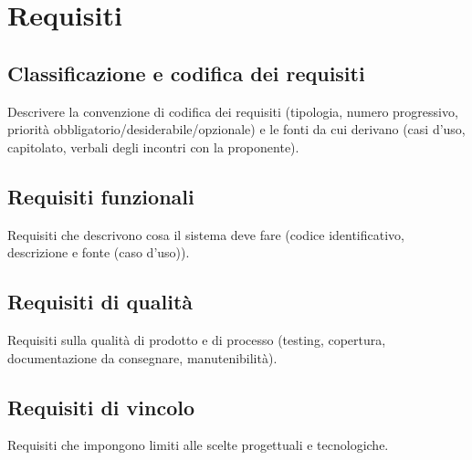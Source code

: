 \documentclass[11pt, a4paper]{article}
\begin{document}
\endgroup

\begingroup
{}


\endgroup

\begingroup
{}


\endgroup

\newpage


\section{Requisiti}

\subsection{Classificazione e codifica dei requisiti}
Descrivere la convenzione di codifica dei requisiti (tipologia, numero progressivo, priorità obbligatorio/desiderabile/opzionale) e le fonti da cui derivano (casi d'uso, capitolato, verbali degli incontri con la proponente).

\subsection{Requisiti funzionali}
Requisiti che descrivono cosa il sistema deve fare (codice identificativo, descrizione e fonte (caso d'uso)).

\subsection{Requisiti di qualità}
Requisiti sulla qualità di prodotto e di processo (testing, copertura, documentazione da consegnare, manutenibilità).

\subsection{Requisiti di vincolo}
Requisiti che impongono limiti alle scelte progettuali e tecnologiche.
\end{document}

